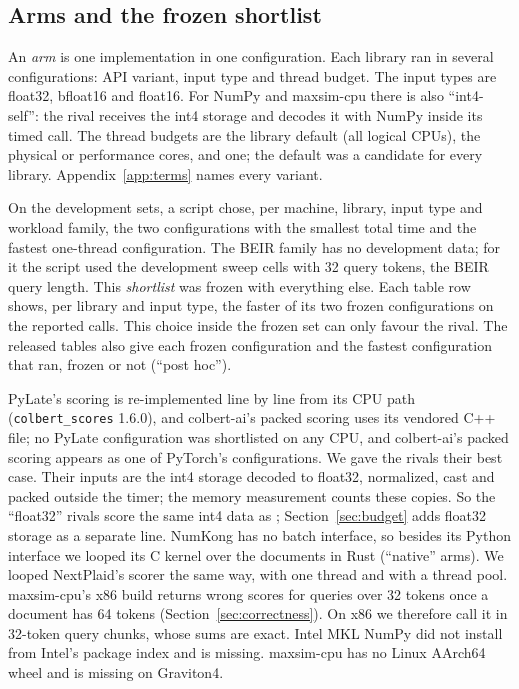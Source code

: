 \subsection{Arms and the frozen shortlist}

An \emph{arm} is one implementation in one configuration.
Each library ran in several configurations: API variant, input type and thread budget.
The input types are float32, bfloat16 and float16.
For NumPy and maxsim-cpu there is also ``int4-self'': the rival receives the int4 storage and decodes it with NumPy inside its timed call.
The thread budgets are the library default (all logical CPUs), the physical or performance cores, and one; the default was a candidate for every library.
Appendix~\ref{app:terms} names every variant.

On the development sets, a script chose, per machine, library, input type and workload family, the two configurations with the smallest total time and the fastest one-thread configuration.
The BEIR family has no development data; for it the script used the development sweep cells with 32 query tokens, the BEIR query length.
This \emph{shortlist} was frozen with everything else.
Each table row shows, per library and input type, the faster of its two frozen configurations on the reported calls.
This choice inside the frozen set can only favour the rival.
The released tables also give each frozen configuration and the fastest configuration that ran, frozen or not (``post hoc'').

PyLate's scoring is re-implemented line by line from its CPU path (\texttt{colbert\_scores} 1.6.0), and colbert-ai's packed scoring uses its vendored C++ file; no PyLate configuration was shortlisted on any CPU, and colbert-ai's packed scoring appears as one of PyTorch's configurations.
We gave the rivals their best case.
Their inputs are the int4 storage decoded to float32, normalized, cast and packed outside the timer; the memory measurement counts these copies.
So the ``float32'' rivals score the same int4 data as \sweet; Section~\ref{sec:budget} adds float32 storage as a separate line.
NumKong has no batch interface, so besides its Python interface we looped its C kernel over the documents in Rust (``native'' arms).
We looped NextPlaid's scorer the same way, with one thread and with a thread pool.
maxsim-cpu's x86 build returns wrong scores for queries over 32 tokens once a document has 64 tokens (Section~\ref{sec:correctness}).
On x86 we therefore call it in 32-token query chunks, whose sums are exact.
Intel MKL NumPy did not install from Intel's package index and is missing.
maxsim-cpu has no Linux AArch64 wheel and is missing on Graviton4.


